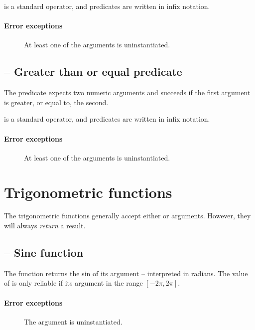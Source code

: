 \q{>} is a standard operator, and \q{>} predicates are written in infix notation.

\paragraph{Error exceptions}
\begin{description}
\item[]
At least one of the arguments is uninstantiated.
\end{description}

\subsection{\function{>=} -- Greater than or equal predicate}
The \function{>=} predicate expects two numeric arguments and succeeds if the first argument is greater, or equal to, the second.
    
\q{>=} is a standard operator, and \q{>=} predicates are written in infix notation.

\paragraph{Error exceptions}
\begin{description}
\item[]
At least one of the arguments is uninstantiated.
\end{description}

\section{Trigonometric functions}
\label{arith:trig}
The trigonometric functions generally accept either  or  arguments. However, they will always \emph{return} a  result.

\subsection{ -- Sine function}
\label{arith:sin}
The  function returns the sin of its argument -- interpreted in radians. The value of  is only reliable if its argument in the range $[-2\pi,2\pi]$.
        
\paragraph{Error exceptions}
\begin{description}
\item[]
The argument is uninstantiated.
\end{description}

